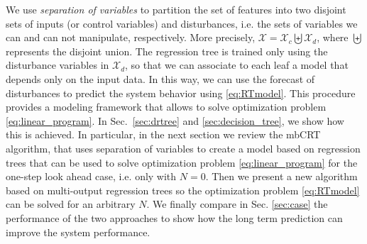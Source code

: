 We use \emph{separation of variables} to partition the set of features into two disjoint sets of inputs (or control variables) and disturbances, i.e. the sets of variables we can and can not manipulate, respectively. 
More precisely, $\mathcal{X} = \mathcal{X}_c\biguplus\mathcal{X}_d$, where $\biguplus$ represents the disjoint union. 
The regression tree is trained only using the disturbance variables in $\mathcal{X}_d$, so that we can associate to each leaf a model that depends only on the input data. 
In this way, we can use the forecast of disturbances to predict the system behavior using \eqref{eq:RTmodel}. This procedure provides a modeling framework that allows to solve optimization problem \eqref{eq:linear_program}. 
In Sec.~\ref{sec:drtree} and \ref{sec:decision_tree}, we show how this is achieved. 
In particular, in the next section we review the mbCRT algorithm, that uses separation of variables to create a model based on regression trees that can be used to solve optimization problem \eqref{eq:linear_program} for the one-step look ahead case, i.e. only with $N=0$. 
Then we present a new algorithm based on multi-output regression trees so the optimization problem \eqref{eq:RTmodel} can be solved for an arbitrary $N$. 
We finally compare in Sec. \ref{sec:case} the performance of the two approaches to show how the long term prediction can improve the system performance.
